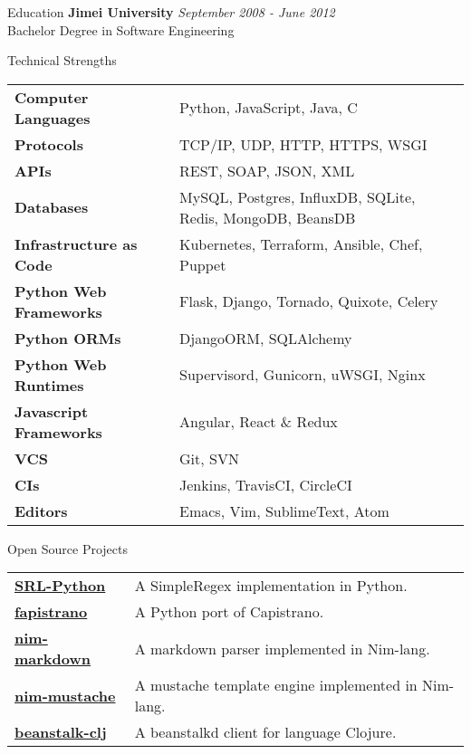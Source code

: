 \documentclass{resume}
\begin{document}
  \iffalse
  \begin{center}
  \textit{ Please refer to \href{http://www.linkedin.com/in/linju}{ my LinkedIn profile } for the complete list of work experience and references.}
  \textit{ http://www.linkedin.com/in/linju }
  \end{center}
  \newpage
  \fi

  \begin{rSection}{Education}
    { \bf Jimei University  } \hfill {\em September 2008 - June 2012 } \\
    { Bachelor Degree in Software Engineering } \\
  \end{rSection}

  \begin{rSection}{Technical Strengths}
    \begin{tabular}{ @{} >{\bfseries}l @{\hspace{6ex}} l }
      Computer Languages & Python, JavaScript, Java, C \\
      Protocols & TCP/IP, UDP, HTTP, HTTPS, WSGI \\
      APIs & REST, SOAP, JSON, XML \\
      Databases & MySQL, Postgres, InfluxDB, SQLite, Redis, MongoDB, BeansDB \\
      Infrastructure as Code & Kubernetes, Terraform, Ansible, Chef, Puppet \\
      Python Web Frameworks & Flask, Django, Tornado, Quixote, Celery \\
      Python ORMs & DjangoORM, SQLAlchemy \\
      Python Web Runtimes & Supervisord, Gunicorn, uWSGI, Nginx \\
      Javascript Frameworks & Angular, React \& Redux \\
      VCS & Git, SVN \\
      CIs & Jenkins, TravisCI, CircleCI \\
      Editors & Emacs, Vim, SublimeText, Atom \\
    \end{tabular}
  \end{rSection}

  \begin{rSection}{Open Source Projects}
    \begin{tabular}{ @{} >{\bfseries}l @{\hspace{6ex}} l }
      \href{https://github.com/SimpleRegex/SRL-Python}{SRL-Python} & A SimpleRegex implementation in Python. \\
      \href{https://github.com/liwushuo/fapistrano}{fapistrano} & A Python port of Capistrano. \\
      \href{https://github.com/soasme/nim-markdown}{nim-markdown} & A markdown parser implemented in Nim-lang. \\
      \href{https://github.com/soasme/nim-mustache}{nim-mustache} & A mustache template engine implemented in Nim-lang. \\
      \href{https://github.com/soasme/beanstalk-clj}{beanstalk-clj} & A beanstalkd client for language Clojure. \\
    \end{tabular}
  \end{rSection}
\end{document}
